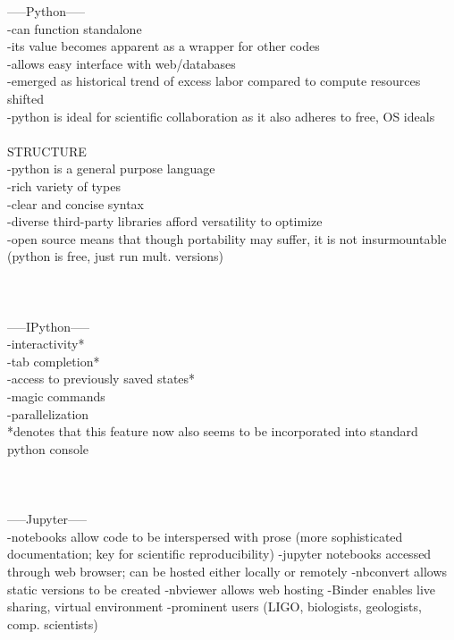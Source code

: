 \documentclass{report}
\begin{document}
-----Python-----\\
-can function standalone\\
-its value becomes apparent as a wrapper for other codes\\
-allows easy interface with web/databases\\
-emerged as historical trend of excess labor compared to compute resources shifted\\
-python is ideal for scientific collaboration as it also adheres to free, OS ideals\\
\-\\
STRUCTURE\\
-python is a general purpose language\\
-rich variety of types\\
-clear and concise syntax\\
-diverse third-party libraries afford versatility to optimize\\
-open source means that though portability may suffer, it is not insurmountable (python is free, just run mult. versions)\\
\-\\
\-\\
\-\\
-----IPython-----\\
-interactivity*\\
-tab completion*\\
-access to previously saved states*\\
-magic commands\\
-parallelization\\
*denotes that this feature now also seems to be incorporated into standard python console\\
\-\\
\-\\
\-\\
-----Jupyter-----\\
-notebooks allow code to be interspersed with prose (more sophisticated documentation; key for scientific reproducibility)
-jupyter notebooks accessed through web browser; can be hosted either locally or remotely
-nbconvert allows static versions to be created
-nbviewer allows web hosting
-Binder enables live sharing, virtual environment
-prominent users (LIGO, biologists, geologists, comp. scientists)
\end{document}

